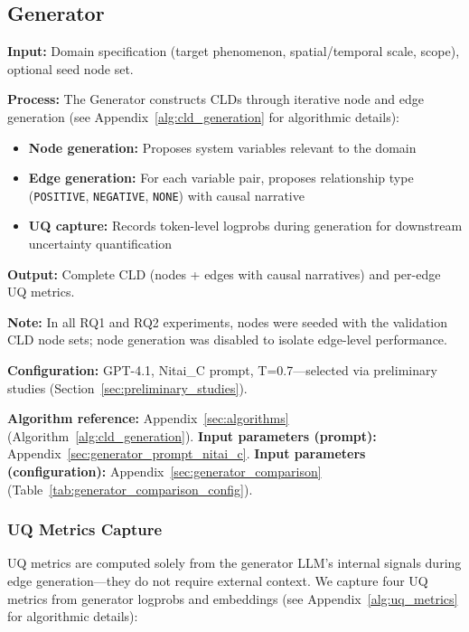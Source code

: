 \subsection{Generator}
\label{sec:generator}

\textbf{Input:} Domain specification (target phenomenon, spatial/temporal scale, scope), optional seed node set.

\textbf{Process:} The Generator constructs CLDs through iterative node and edge generation (see Appendix~\ref{alg:cld_generation} for algorithmic details):
\begin{itemize}[noitemsep]
    \item \textbf{Node generation:} Proposes system variables relevant to the domain
    \item \textbf{Edge generation:} For each variable pair, proposes relationship type (\texttt{POSITIVE}, \texttt{NEGATIVE}, \texttt{NONE}) with causal narrative
    \item \textbf{UQ capture:} Records token-level logprobs during generation for downstream uncertainty quantification
\end{itemize}

\textbf{Output:} Complete CLD (nodes + edges with causal narratives) and per-edge UQ metrics.

\textbf{Note:} In all RQ1 and RQ2 experiments, nodes were seeded with the validation CLD node sets; node generation was disabled to isolate edge-level performance.

\textbf{Configuration:} GPT-4.1, Nitai\_C prompt, T=0.7---selected via preliminary studies (Section~\ref{sec:preliminary_studies}).

\textbf{Algorithm reference:} Appendix~\ref{sec:algorithms} (Algorithm~\ref{alg:cld_generation}). \textbf{Input parameters (prompt):} Appendix~\ref{sec:generator_prompt_nitai_c}. \textbf{Input parameters (configuration):} Appendix~\ref{sec:generator_comparison} (Table~\ref{tab:generator_comparison_config}).

\subsubsection{UQ Metrics Capture}
\label{sec:uq_metrics_definition}

UQ metrics are computed solely from the generator LLM's internal signals during edge generation---they do not require external context. We capture four UQ metrics from generator logprobs and embeddings (see Appendix~\ref{alg:uq_metrics} for algorithmic details):

